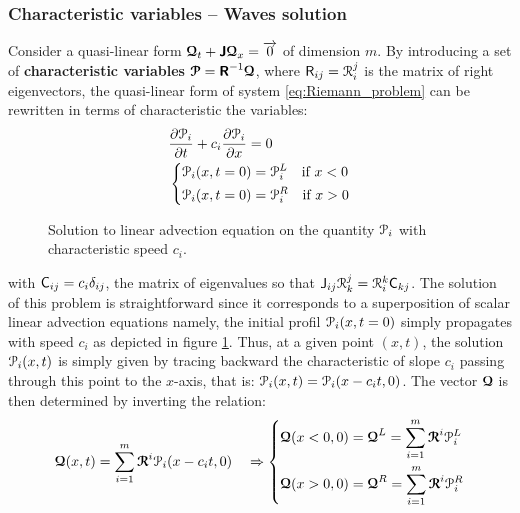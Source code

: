 \subsubsection*{Characteristic variables -- Waves solution}
Consider a quasi-linear form ${\boldsymbol{\mathcal{Q}}}_t + \boldsymbol{\mathsf{J}} {\boldsymbol{\mathcal{Q}}}_x={\overrightarrow{0}}$ of dimension $m$. 
By introducing a set of \textbf{characteristic variables} ${\boldsymbol{\mathcal{P}}}=\boldsymbol{\mathsf{R}}^{-1}{\boldsymbol{\mathcal{Q}}}$, where $\mathsf{R}_{ij}=\mathcal{R}^j_i$ is the matrix of right eigenvectors, the quasi-linear form of system \eqref{eq:Riemann_problem} can be rewritten in terms of characteristic the variables:
\begin{equation*}
  \begin{aligned}
    &\frac{\partial \mathcal{P}_i}{\partial t} + c_i\frac{\partial \mathcal{P}_i}{\partial x} = 0 \\
    &\left\lbrace 
      \begin{aligned}
        & \mathcal{P}_i(x,t=0) = \mathcal{P}_i^L \quad \text{if } x< 0\\
        & \mathcal{P}_i(x,t=0) = \mathcal{P}_i^R \quad \text{if } x> 0
      \end{aligned}
    \right.
  \end{aligned}
\end{equation*}
\begin{figure}[h]
  \centering
  \subfloat{}
  \subfloat{}
  \caption{Solution to linear advection equation on the quantity $\mathcal{P}_i$ with characteristic speed $c_i$.}
  \label{fig:advection}
\end{figure}
with $\mathsf{C}_{ij}=c_i\delta_{ij}$, the matrix of eigenvalues so that $\mathsf{J}_{ij} \mathcal{R}^j_k = \mathcal{R}^k_i\mathsf{C}_{kj}$. The solution of this problem is straightforward since it corresponds to a superposition of scalar linear advection equations namely, the initial profil $\mathcal{P}_i(x,t=0)$ simply propagates with speed $c_i$ as depicted in figure \ref{fig:advection}. Thus, at a given point $(x,t)$, the solution $\mathcal{P}_i(x,t)$ is simply given by tracing backward the characteristic of slope $c_i$ passing through this point to the $x$-axis, that is: $\mathcal{P}_i(x,t)=\mathcal{P}_i(x-c_it,0)$. 
The vector ${\boldsymbol{\mathcal{Q}}}$ is then determined by inverting the relation:
\begin{equation}
  \label{eq:Q_expansion}
  {\boldsymbol{\mathcal{Q}}}(x,t) = \sum_{i=1}^m {\boldsymbol{\mathcal{R}}}^i \mathcal{P}_i(x-c_it,0) \quad \Rightarrow
  \left\lbrace
    \begin{aligned}
      & {\boldsymbol{\mathcal{Q}}}(x<0,0)={\boldsymbol{\mathcal{Q}}}^L=\sum_{i=1}^{m}{\boldsymbol{\mathcal{R}}}^i \mathcal{P}_i^L\\
      & {\boldsymbol{\mathcal{Q}}}(x>0,0)={\boldsymbol{\mathcal{Q}}}^R= \sum_{i=1}^{m}{\boldsymbol{\mathcal{R}}}^i \mathcal{P}_i^R
    \end{aligned}
    \right.
\end{equation}
